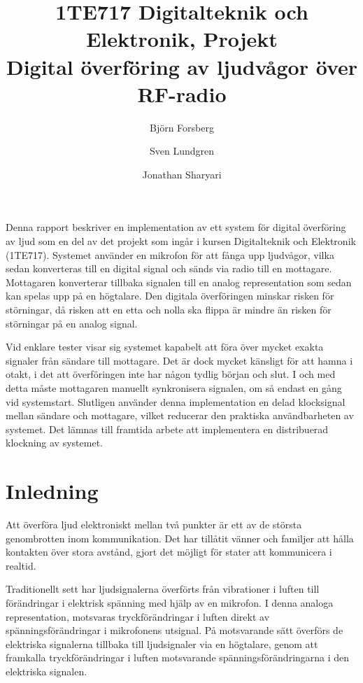 \documentclass[a4paper,10pt]{article}
\title{{\small 1TE717 Digitalteknik och Elektronik, Projekt} \\ \textbf{Digital överföring av ljudvågor över RF-radio}}
\author{Bj{\"o}rn Forsberg \and Sven Lundgren \and Jonathan Sharyari}
\begin{document}
\maketitle

\abstract

Denna rapport beskriver en implementation av ett system för digital 
överföring av ljud som en del av det projekt som ingår i kursen Digitalteknik 
och Elektronik (1TE717). Systemet använder en mikrofon för att fånga upp 
ljudvågor, vilka sedan konverteras till en digital signal och sänds via radio 
till en mottagare. Mottagaren konverterar tillbaka signalen till en analog 
representation som sedan kan spelas upp på en högtalare. Den digitala 
överföringen minskar risken för störningar, då risken att en etta och nolla ska 
flippa är mindre än risken för störningar på en analog signal.

Vid enklare tester visar sig systemet kapabelt att föra över mycket exakta 
signaler från sändare till mottagare. Det är dock mycket känsligt för att hamna
i otakt, i det att överföringen inte har någon tydlig början och slut. I och med
detta måste mottagaren manuellt synkronisera signalen, om så endast en gång vid 
systemstart. Slutligen använder denna implementation en delad klocksignal mellan 
sändare och mottagare, vilket reducerar den praktiska användbarheten av 
systemet. Det lämnas till framtida arbete att implementera en distribuerad 
klockning av systemet.

\section{Inledning}

Att överföra ljud elektroniskt mellan två punkter är ett av de största 
genombrotten inom kommunikation. Det har tillåtit vänner och familjer  att hålla 
kontakten över stora avstånd, gjort det möjligt för stater att kommunicera i 
realtid.

Traditionellt sett har ljudsignalerna överförts från vibrationer i luften till
förändringar i elektrisk spänning med hjälp av en mikrofon. I denna analoga 
representation, motsvaras tryckförändringar i luften direkt av 
spänningsförändringar i mikrofonens utsignal. På motsvarande sätt överförs de
elektriska signalerna tillbaka till ljudsignaler via en högtalare, genom att 
framkalla tryckförändringar i luften motsvarande spänningsförändringarna i
den elektriska signalen.
\end{document}
